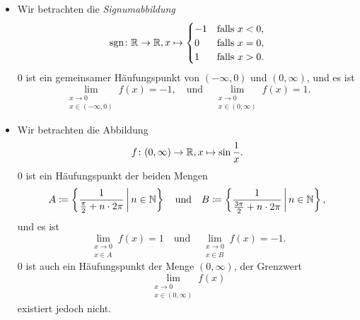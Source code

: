 \documentclass[a4paper,10pt]{article}
\begin{document}
\begin{bsp}
 \begin{itemize}
  \item
   Wir betrachten die \emph{Signumabbildung}
   \[
    \operatorname{sgn} \colon \mathbb{R} \to \mathbb{R},
    x \mapsto
    \begin{cases}
     -1 & \text{falls $x < 0$}, \\
      0 & \text{falls $x = 0$}, \\
      1 & \text{falls $x > 0$}.
    \end{cases}
   \]
   $0$ ist ein gemeinsamer Häufungspunkt von $(-\infty,0)$ und $(0,\infty)$, und es ist
   \[
    \lim_{\substack{x \to 0 \\ x \in (-\infty, 0)}} f(x) = -1,
    \quad
    \text{und}
    \quad
    \lim_{\substack{x \to 0 \\ x \in (0, \infty)}} f(x) = 1.
   \]
  \item
   Wir betrachten die Abbildung
   \[
    f \colon (0,\infty) \to \mathbb{R}, x \mapsto \sin \frac{1}{x}.
   \]
   $0$ ist ein Häufungspunkt der beiden Mengen
   \[
    A \coloneqq \left\{ \frac{1}{\frac{\pi}{2} + n \cdot 2\pi} \,\middle|\, n \in \mathbb{N} \right\}
    \quad
    \text{und}
    \quad
    B \coloneqq \left\{ \frac{1}{\frac{3\pi}{2} + n \cdot 2\pi} \,\middle|\, n \in \mathbb{N} \right\},
   \]
   und es ist
   \[
    \lim_{\substack{x \to 0 \\ x \in A}} f(x) = 1
    \quad
    \text{und}
    \quad
    \lim_{\substack{x \to 0 \\ x \in B}} f(x) = -1.
   \]
   $0$ ist auch ein Häufungspunkt der Menge $(0,\infty)$, der Grenzwert
   \[
    \lim_{\substack{x \to 0 \\ x \in (0,\infty)}} f(x)
   \]
   existiert jedoch nicht.
 \end{itemize}
\end{bsp}
\end{document}
